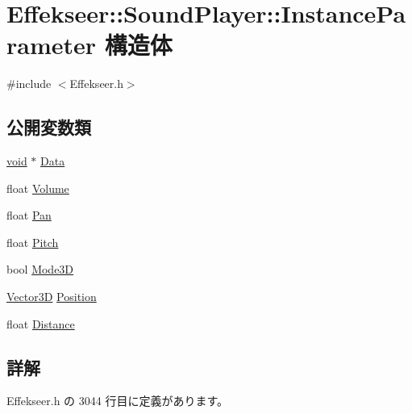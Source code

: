 \hypertarget{struct_effekseer_1_1_sound_player_1_1_instance_parameter}{}\section{Effekseer\+:\+:Sound\+Player\+:\+:Instance\+Parameter 構造体}
\label{struct_effekseer_1_1_sound_player_1_1_instance_parameter}


{\ttfamily \#include $<$Effekseer.\+h$>$}

\subsection*{公開変数類}
\begin{DoxyCompactItemize}
\item 
\mbox{\hyperlink{namespace_effekseer_ab34c4088e512200cf4c2716f168deb56}{void}} $\ast$ \mbox{\hyperlink{struct_effekseer_1_1_sound_player_1_1_instance_parameter_a882efc09266af458007f54298e288150}{Data}}
\item 
float \mbox{\hyperlink{struct_effekseer_1_1_sound_player_1_1_instance_parameter_ab128c51dd7ae26cc09c6a3ee716b9a14}{Volume}}
\item 
float \mbox{\hyperlink{struct_effekseer_1_1_sound_player_1_1_instance_parameter_ade1b072a2382d08ca7dbe7f8ea4a8c08}{Pan}}
\item 
float \mbox{\hyperlink{struct_effekseer_1_1_sound_player_1_1_instance_parameter_a642e90999b491b94def5164be452ee8f}{Pitch}}
\item 
bool \mbox{\hyperlink{struct_effekseer_1_1_sound_player_1_1_instance_parameter_ad80b9ddad2b07d89ecd865f1838cc84a}{Mode3D}}
\item 
\mbox{\hyperlink{struct_effekseer_1_1_vector3_d}{Vector3D}} \mbox{\hyperlink{struct_effekseer_1_1_sound_player_1_1_instance_parameter_a91587aeddc1536abfc346aa2e289fdd1}{Position}}
\item 
float \mbox{\hyperlink{struct_effekseer_1_1_sound_player_1_1_instance_parameter_a89783f7ffd762a9d44580fc302a753b8}{Distance}}
\end{DoxyCompactItemize}


\subsection{詳解}


 Effekseer.\+h の 3044 行目に定義があります。



